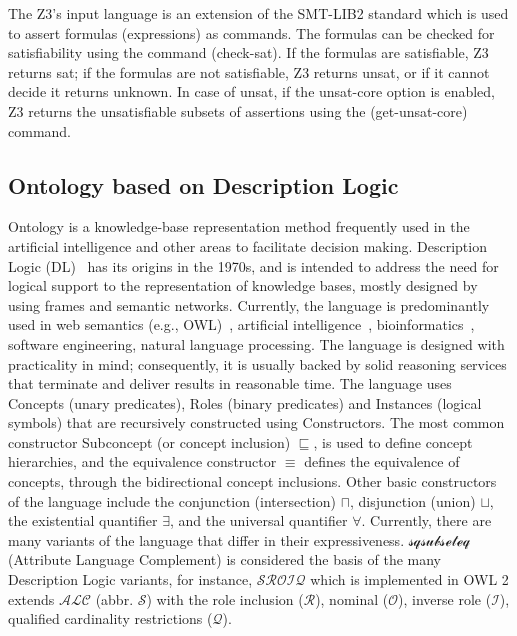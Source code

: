 The Z3's input language is an extension of the SMT-LIB2 standard which is used to assert formulas (expressions) as commands. The formulas can be checked for satisfiability using the command (check-sat). If the formulas are satisfiable, Z3 returns sat; if the formulas are not satisfiable, Z3 returns unsat, or if it cannot decide it returns unknown. In case of unsat, if the unsat-core option is enabled, Z3 returns the unsatisfiable subsets of assertions using the (get-unsat-core) command.

\subsection*{Ontology based on Description Logic}
Ontology is a knowledge-base representation method frequently used in the artificial intelligence and other areas to facilitate decision making. Description Logic (DL)~\cite{Baader2010TheApplications} has its origins in the 1970s, and is intended to address the need for logical support to the representation of knowledge bases, mostly designed by using frames and semantic networks. Currently, the language is predominantly used in web semantics (e.g., OWL)~\cite{conf/owled/ShearerMH08}, artificial intelligence~\cite{10.1007/978-94-017-9297-4_7}, bioinformatics~\cite{Rector2006}, software engineering, natural language processing. The language is designed with practicality in mind; consequently, it is usually backed by solid reasoning services that terminate and deliver results in reasonable time. The language uses Concepts (unary predicates), Roles (binary predicates) and Instances (logical symbols) that are recursively constructed using Constructors. The most common constructor Subconcept (or concept inclusion) $\sqsubseteq$, is used to define concept hierarchies, and the equivalence constructor $\equiv$ defines the equivalence of concepts, through the bidirectional concept inclusions. Other basic constructors of the language include the conjunction (intersection) $\sqcap$, disjunction (union) $\sqcup$, the existential quantifier $\exists$, and the universal quantifier $\forall$. Currently, there are many variants of the language that differ in their expressiveness. $\mathcal{sqsubseteq}$ (Attribute Language Complement) is considered the basis of the many Description Logic variants, for instance, $\mathcal{SROIQ}$ which is implemented in OWL 2 extends $\mathcal{ALC}$ (abbr. $\mathcal{S}$) with the role inclusion ($\mathcal{R}$), nominal ($\mathcal{O}$), inverse role ($\mathcal{I}$), qualified cardinality restrictions ($\mathcal{Q}$). 

